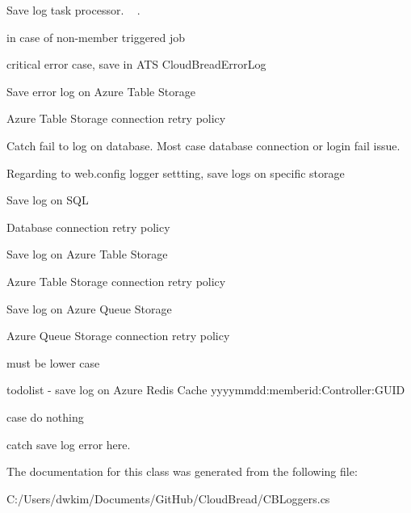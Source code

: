 Save log task processor. ~\newline
. 

in case of non-\/member triggered job

critical error case, save in A\+TS Cloud\+Bread\+Error\+Log

Save error log on Azure Table Storage

Azure Table Storage connection retry policy

Catch fail to log on database. Most case database connection or login fail issue.

Regarding to web.\+config logger settting, save logs on specific storage

Save log on S\+QL

Database connection retry policy

Save log on Azure Table Storage

Azure Table Storage connection retry policy

Save log on Azure Queue Storage

Azure Queue Storage connection retry policy

must be lower case

todolist -\/ save log on Azure Redis Cache yyyymmdd\+:memberid\+:\+Controller\+:G\+U\+ID

case do nothing

catch save log error here. 

The documentation for this class was generated from the following file\+:\begin{DoxyCompactItemize}
\item 
C\+:/\+Users/dwkim/\+Documents/\+Git\+Hub/\+Cloud\+Bread/C\+B\+Loggers.\+cs\end{DoxyCompactItemize}
